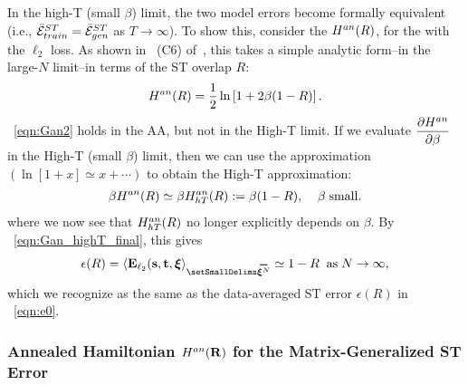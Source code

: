 In the high-T (small $\beta$) limit, the two model errors become formally equivalent
(i.e., $\bar{\mathcal{E}}^{ST}_{train}=\bar{\mathcal{E}}^{ST}_{gen}$ as $T\rightarrow\infty$).
To show this, consider the \AnnealedHamiltonian $H^{an}(R)$, for the \LinearPerceptron with the $\ell_2$ loss. 
As shown in \EQN~(C6) of~\cite{SST92}, this takes a simple analytic form--in the large-$N$ limit--in terms of the ST overlap $R$:
\begin{align}
\label{eqn:Gan2}
H^{an}(R) = \dfrac{1}{2}\ln\left[{1+2\beta(1-R)}\right]  .
\end{align}
\EQN~\ref{eqn:Gan2} holds in the AA, but not in the High-T limit.
If we evaluate $\dfrac{\partial H^{an}}{\partial \beta}$ in the High-T (small $\beta$) limit, 
then we can use the approximation $(\ln[1+x]\simeq x+\cdots)$ to obtain the High-T approximation:
\begin{align}
\label{eqn:Gan3}
\beta H^{an}(R) \simeq 
\beta H^{an}_{hT}(R):=\beta(1-R),\;\;\;\;\beta\;\text{small}  .
\end{align}
where we now see that $H^{an}_{hT}(R)$ no longer explicitly depends on $\beta$.
%
By \EQN~\ref{eqn:Gan_highT_final}, this gives 
\begin{align}
\label{eqn:Gan4}
\EPSL(R) =
\langle  \mathbf{E}_{\ell_2}(\SVEC,\TVEC,\XI \rangle_{\AVGNDXI} \simeq 1-R\;\;\text{as}\;N\rightarrow\infty  ,
\end{align}
which we recognize as the same as the data-averaged ST error $\epsilon(R)$ in \EQN~\ref{eqn:e0}.


\subsubsection{Annealed Hamiltonian $H^{an}(\mathbf{R})$ for the Matrix-Generalized ST Error}
\label{sxn:appendix_Gan}

